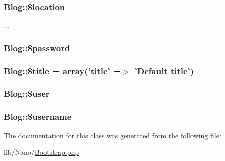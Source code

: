 \hypertarget{classBlog_22fd08c70b0a938697bb0b4a0ec97a18}{
\subsubsection[{\$location}]{\setlength{\rightskip}{0pt plus 5cm}Blog::\$location}}
\label{classBlog_22fd08c70b0a938697bb0b4a0ec97a18}


... \hypertarget{classBlog_7cec9963b5a835d5486ac424e6e7a49e}{
\subsubsection[{\$password}]{\setlength{\rightskip}{0pt plus 5cm}Blog::\$password}}
\label{classBlog_7cec9963b5a835d5486ac424e6e7a49e}


\hypertarget{classBlog_0cd1af25f3b38873d57c33c2542dacc7}{
\subsubsection[{\$title}]{\setlength{\rightskip}{0pt plus 5cm}Blog::\$title = array('title' =$>$ 'Default title')}}
\label{classBlog_0cd1af25f3b38873d57c33c2542dacc7}


\hypertarget{classBlog_848e0309404b8bf01fd3577fe6190bb6}{
\subsubsection[{\$user}]{\setlength{\rightskip}{0pt plus 5cm}Blog::\$user}}
\label{classBlog_848e0309404b8bf01fd3577fe6190bb6}


\hypertarget{classBlog_81523bc8c63e738d89791f27263903aa}{
\subsubsection[{\$username}]{\setlength{\rightskip}{0pt plus 5cm}Blog::\$username}}
\label{classBlog_81523bc8c63e738d89791f27263903aa}




The documentation for this class was generated from the following file:\begin{CompactItemize}
\item 
lib/Nano/\hyperlink{Bootstrap_8php}{Bootstrap.php}\end{CompactItemize}
